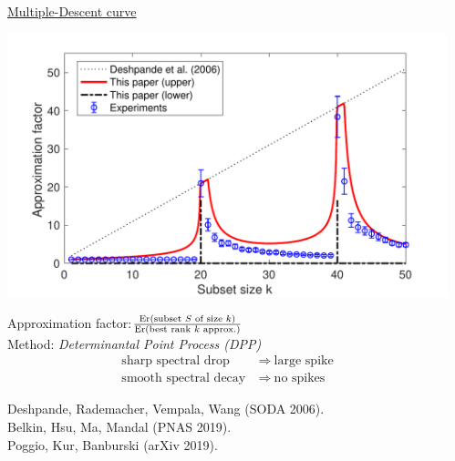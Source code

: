 \documentclass[8pt]{beamer}
\begin{document}
\begin{frame}
\begin{columns}
\begin{column}{0.53\textwidth}
  \end{column}
\begin{column}{0.53\textwidth}
    \begin{center}
    {\large\underline{Multiple-Descent curve}}
  \end{center}
  \includegraphics[width=\textwidth]{../figs/nystrom/nystrom-bounds}
  \vspace{0mm}
  
Approximation factor:\quad$\frac{\mathrm{Er}(\text{subset $S$ of
    size $k$})}{\mathrm{Er}(\text{best rank $k$ approx.})}$\\[1mm]
Method: \textit{Determinantal Point Process (DPP)}
\vspace{-2mm}
    \begin{align*}
      \text{sharp spectral drop}\ &\Longrightarrow\ \text{large spike}\\[-1mm]
      \text{smooth spectral decay}\ &\Longrightarrow\ \text{no spikes}
    \end{align*}
    \vspace{-2mm}
    
    {\footnotesize
      Deshpande, Rademacher, Vempala, Wang (SODA 2006).\\
        Belkin, Hsu, Ma, Mandal (PNAS 2019).\\[-1mm]
      Poggio, Kur, Banburski (arXiv 2019).
    }
  \end{column}
\end{columns}
\pause\pause\pause
\end{frame}
\end{document}
